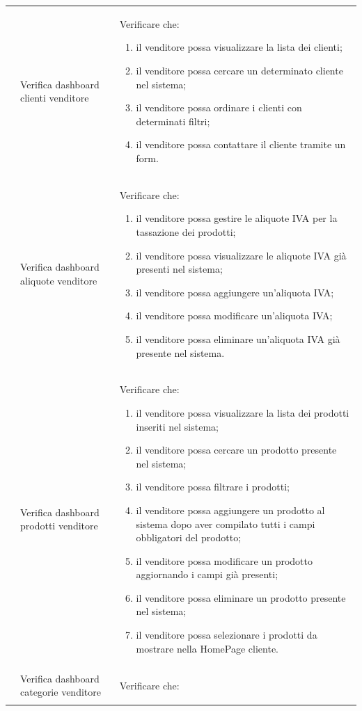 \begin{center}
\begin{longtable}{|p{1cm}|p{4.85cm}|p{9cm}|}
	 & Verifica dashboard clienti venditore & Verificare che:
	\begin{enumerate}
		\item il venditore possa visualizzare la lista dei clienti;
		\item il venditore possa cercare un determinato cliente nel sistema;
		\item il venditore possa ordinare i clienti con determinati filtri;
		\item il venditore possa contattare il cliente tramite un form.
	\end{enumerate} \\
	 & Verifica dashboard aliquote venditore & Verificare che:
	\begin{enumerate}
		\item il venditore possa gestire le aliquote IVA per la tassazione dei prodotti;
		\item il venditore possa visualizzare le aliquote IVA già presenti nel sistema;
		\item il venditore possa aggiungere un'aliquota IVA;
		\item il venditore possa modificare un'aliquota IVA;
		\item il venditore possa eliminare un'aliquota IVA già presente nel sistema.
	\end{enumerate} \\
	 & Verifica dashboard prodotti venditore & Verificare che:
	\begin{enumerate}
		\item il venditore possa visualizzare la lista dei prodotti inseriti nel sistema;
		\item il venditore possa cercare un prodotto presente nel sistema;
		\item il venditore possa filtrare i prodotti;
		\item il venditore possa aggiungere un prodotto al sistema dopo aver compilato tutti i campi obbligatori del prodotto;
		\item il venditore possa modificare un prodotto aggiornando i campi già presenti;
		\item il venditore possa eliminare un prodotto presente nel sistema;
		\item il venditore possa selezionare i prodotti da mostrare nella HomePage cliente.
	\end{enumerate} \\
	 & Verifica dashboard categorie venditore & Verificare che:
	\begin{enumerate}

\end{enumerate}
\end{longtable}
\end{center}
